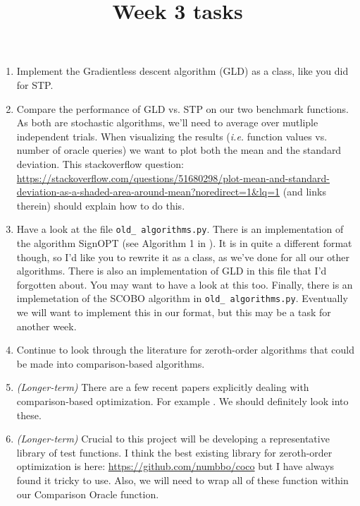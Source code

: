 \documentclass[12pt]{article}
\title{Week 3 tasks}
\begin{document}
\maketitle

\begin{enumerate}
	\item Implement the Gradientless descent algorithm (GLD) as a class, like you did for STP.
	
	\item Compare the performance of GLD vs. STP on our two benchmark functions. As both are stochastic algorithms, we'll need to average over mutliple independent trials. When visualizing the results ({\em i.e.} function values vs. number of oracle queries) we want to plot both the mean and the standard deviation. This stackoverflow question: \url{https://stackoverflow.com/questions/51680298/plot-mean-and-standard-deviation-as-a-shaded-area-around-mean?noredirect=1&lq=1} (and links therein) should explain how to do this. \\
	
	\item Have a look at the file {\tt old\_ algorithms.py}. There is an implementation of the algorithm SignOPT (see Algorithm 1 in \cite{cheng2019sign}). It is in quite a different format though, so I'd like you to rewrite it as a class, as we've done for all our other algorithms. There is also an implementation of GLD in this file that I'd forgotten about. You may want to have a look at this too. Finally, there is an implemetation of the SCOBO algorithm \cite{cai2020scobo} in  {\tt old\_ algorithms.py}. Eventually we will want to implement this in our format, but this may be a task for another week. \\
	
	\item Continue to look through the literature for zeroth-order algorithms that could be made into comparison-based algorithms. \\
	
	\item  {\em (Longer-term)} There are a few recent papers explicitly dealing with comparison-based optimization. For example \cite{karabag2021smooth}. We should definitely look into these. \\
	
	\item {\em (Longer-term)} Crucial to this project will be developing a representative library of test functions. I think the best existing library for zeroth-order optimization is here: \url{https://github.com/numbbo/coco} but I have always found it tricky to use. Also, we will need to wrap all of these function within our Comparison Oracle function. \\
\end{enumerate}



\end{document}
